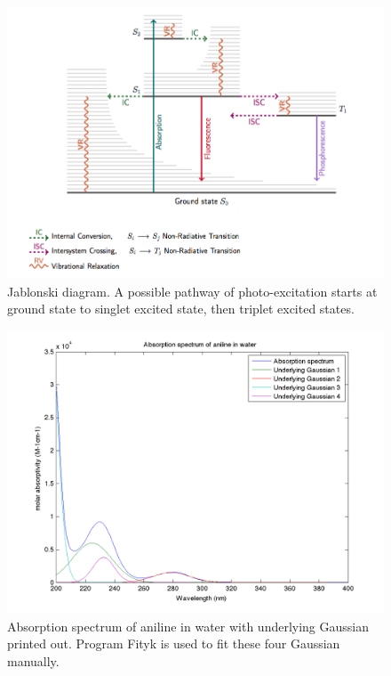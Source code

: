 \documentclass[
journal=jpcbfk, %
manuscript=article]{achemso}
\begin{document}
\begin{figure}[htb]
	\centering		
	\includegraphics[width=1\textwidth]{jablonski.png}
	\caption{Jablonski diagram. A possible pathway of photo-excitation starts at ground state to singlet excited state, then triplet excited states.}
	\label{fig:jablonski}
\end{figure}
\begin{figure}[htb]
	\centering		
	\includegraphics[width=1\textwidth]{UVFromFityk.png}
	\caption{Absorption spectrum of aniline in water with underlying Gaussian printed out. Program Fityk is used to fit these four Gaussian manually.}
	\label{fig:UVFromFityk}
\end{figure}
\end{document}
